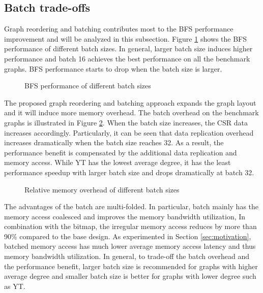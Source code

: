 \subsection{Batch trade-offs}
Graph reordering and batching contributes most to the BFS performance 
improvement and will be analyzed in this subsection. 
Figure \ref{fig:batch-perf} shows the BFS performance of different batch sizes.
In general, larger batch size induces higher performance and batch 16 
achieves the best performance on all the benchmark graphs. BFS performance 
starts to drop when the batch size is larger.  
\begin{figure}
    \caption{BFS performance of different batch sizes}
\label{fig:batch-perf}
\vspace{-1em}
\end{figure}


The proposed graph reordering and batching approach expands the 
graph layout and it will induce more memory overhead. The batch overhead 
on the benchmark graphs is illustrated in Figure \ref{fig:batch-overhead}. 
When the batch size increases, the CSR data increases accordingly. 
Particularly, it can be seen that data replication overhead 
increases dramatically when the batch size reaches 32. 
As a result, the performance benefit is compensated 
by the additional data replication and memory access.
While YT has the lowest average degree, it has the least performance 
speedup with larger batch size and drops dramatically at batch 32.

\begin{figure}
    \caption{Relative memory overhead of different batch sizes}
\label{fig:batch-overhead}
\vspace{-1em}
\end{figure}

The advantages of the batch are multi-folded.
In particular, batch mainly has the memory 
access coalesced and improves the memory bandwidth utilization, 
In combination with the bitmap, the irregular memory access 
reduces by more than 90\% compared to the base design.
As experimented in Section \ref{sec:motivation}, batched memory 
access has much lower average memory access latency and thus memory 
bandwidth utilization. In general, to trade-off the batch 
overhead and the performance benefit, 
larger batch size is recommended for graphs with higher average degree 
and smaller batch size is better for graphs with lower degree 
such as YT.  


